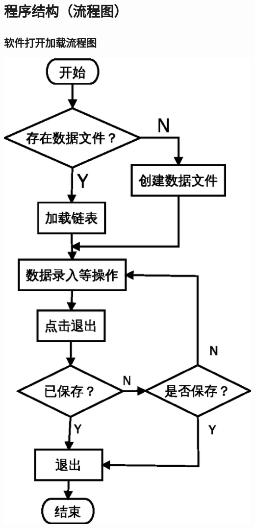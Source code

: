 \documentclass[10pt,a4paper]{article}
\begin{document}
\section{程序结构（流程图）}
\subsection{软件打开加载流程图}
\begin{center}
\includegraphics{uml1}
\newline
\end{center}
\end{document}
